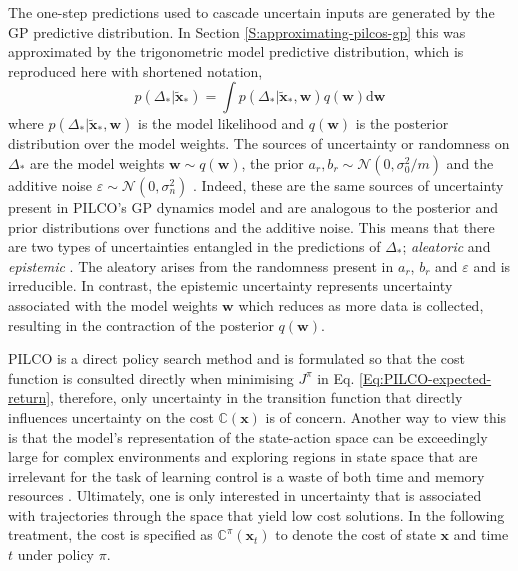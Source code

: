 The one-step predictions used to cascade uncertain inputs are generated by the GP predictive distribution. In Section \ref{S:approximating-pilcos-gp} this was approximated by the trigonometric model predictive distribution, which is reproduced here with shortened notation,
\begin{equation}
    p(\Delta_{*} | \tilde{\mathbf{x}}_{*})=\int p(\Delta_{*} | \tilde{\mathbf{x}}_{*}, \mathbf{w}) q(\mathbf{w}) \mathrm{d} \mathbf{w}
    \label{Eq:Unc-predictive distribution}
\end{equation}
where $p(\Delta_{*} | \tilde{\mathbf{x}}_{*}, \mathbf{w})$ is the model likelihood and $q(\mathbf{w})$ is the posterior distribution over the model weights. The sources of uncertainty or randomness on $\Delta_{*}$ are the model weights $\mathbf{w}\sim q(\mathbf{w})$, the prior $a_{r}, b_{r} \sim \mathcal{N}\left(0,\sigma_{0}^{2}/m\right)$ and the additive noise $\varepsilon \sim \mathcal{N}\left(0,\sigma_{n}^{2} \right)$ \citep{depeweg2017decomposition}. Indeed, these are the same sources of uncertainty present in PILCO's GP dynamics model and are analogous to the posterior and prior distributions over functions and the additive noise. This means that there are two types of uncertainties entangled in the predictions of $\Delta_{*}$; \textit{aleatoric} and \textit{epistemic} \citep{der2009aleatory}\citep{kendall2017uncertainties}. The aleatory arises from the randomness present in $a_{r}$, $b_{r}$ and $\varepsilon$ and is irreducible. In contrast, the epistemic uncertainty represents uncertainty associated with the model weights $\mathbf{w}$ which reduces as more data is collected, resulting in the contraction of the posterior $q(\mathbf{w})$.

PILCO is a direct policy search method and is formulated so that the cost function is consulted directly when minimising $J^{\pi}$ in Eq. \ref{Eq:PILCO-expected-return}, therefore, only uncertainty in the transition function that directly influences uncertainty on the cost $\mathbb{C}(\mathbf{x})$ is of concern. Another way to view this is that the model's representation of the state-action space can be exceedingly large for complex environments and exploring regions in state space that are irrelevant for the task of learning control is a waste of both time and memory
resources . Ultimately, one is only interested in uncertainty that is associated with trajectories through the space that yield low cost solutions. In the following treatment, the cost is specified as $\mathbb{C}^{\pi}(\mathbf{x}_{t})$ to denote the cost of state $\mathbf{x}$ and time $t$ under policy $\pi$. 

